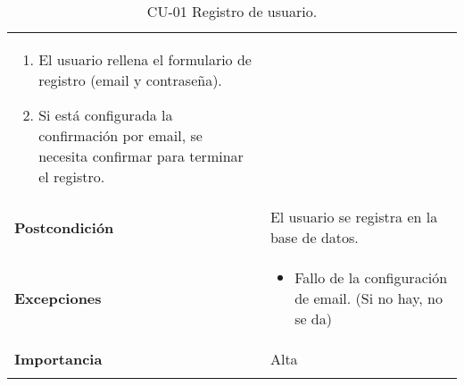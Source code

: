 \begin{longtable}[H]{@{}ll@{}}
\begin{minipage}[t]{0.68\columnwidth}
\begin{enumerate}
\def\labelenumi{\arabic{enumi}.}
\tightlist
\item
  El usuario rellena el formulario de registro (email y contraseña).
\item
  Si está configurada la confirmación por email, se necesita confirmar para terminar el registro.
\end{enumerate}\strut
\end{minipage}\tabularnewline
\begin{minipage}[t]{0.26\columnwidth}\raggedright\strut
\textbf{Postcondición}\strut
\end{minipage} & \begin{minipage}[t]{0.68\columnwidth}\raggedright\strut%
El usuario se registra en la base de datos.\strut
\end{minipage}\tabularnewline
\begin{minipage}[t]{0.26\columnwidth}\raggedright\strut
\textbf{Excepciones}\strut
\end{minipage} & \begin{minipage}[t]{0.68\columnwidth}\raggedright\strut%
\begin{itemize}
\tightlist
\item
  Fallo de la configuración de email. (Si no hay, no se da)
\end{itemize}\strut
\end{minipage}\tabularnewline
\begin{minipage}[t]{0.26\columnwidth}\raggedright\strut
\textbf{Importancia}\strut
\end{minipage} & \begin{minipage}[t]{0.68\columnwidth}\raggedright\strut%
Alta\strut
\end{minipage}\tabularnewline
\bottomrule%
\caption{CU-01 Registro de usuario.}
\end{longtable}


